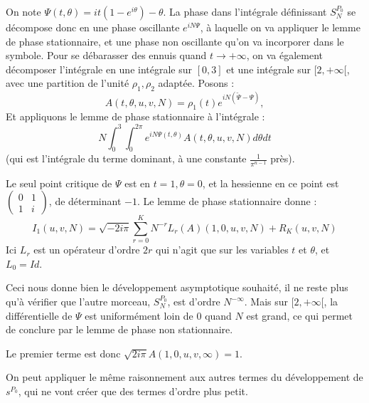 \begin{preuve}
	On note $\Psi(t,\theta) = it(1-e^{i\theta})-\theta$. La phase dans l'intégrale définissant $S_N^{P_0}$ se décompose donc en une phase oscillante $e^{iN\Psi}$, à laquelle on va appliquer le lemme de phase stationnaire, et une phase non oscillante qu'on va incorporer dans le symbole. Pour se débarasser des ennuis quand $t \to +\infty$, on va également décomposer l'intégrale en une intégrale sur $[0,3]$ et une intégrale sur $[2,+\infty[$, avec une partition de l'unité $\rho_1,\rho_2$ adaptée. Posons :
	\begin{equation*}
		A(t,\theta, u,v,N) = \rho_1(t)e^{iN(\tilde{\Psi}-\Psi)},
	\end{equation*} 
	Et appliquons le lemme de phase stationnaire à l'intégrale :
	\begin{equation*}
		N\int_0^3\int_0^{2\pi}e^{iN\Psi(t,\theta)}A(t,\theta, u,v,N)d\theta  dt
	\end{equation*}
	(qui est l'intégrale du terme dominant, à une constante $\frac{1}{\pi^{n-1}}$ près).
	
	Le seul point critique de $\Psi$ est en $t=1, \theta=0$, et la hessienne en ce point est $\begin{pmatrix}
	0&1\\1&i
	\end{pmatrix}$, de déterminant $-1$. Le lemme de phase stationnaire donne :
	\begin{equation*}
	I_1(u,v,N) =\sqrt{-2i\pi}\sum_{r=0}^K N^{-r}L_r(A)(1,0,u,v,N) + R_K(u,v,N)
	\end{equation*}
	Ici $L_r$ est un opérateur d'ordre $2r$ qui n'agit que sur les variables $t$ et $\theta$, et $L_0=Id$. 
	
	Ceci nous donne bien le développement asymptotique souhaité, il ne reste plus qu'à vérifier que l'autre morceau, $S_N^{P_0}$, est d'ordre $N^{-\infty}$. Mais sur $[2,+\infty[$, la différentielle de $\Psi$ est uniformément loin de $0$ quand $N$ est grand, ce qui permet de conclure par le lemme de phase non stationnaire.
	
	Le premier terme est donc $\sqrt{2i\pi}A(1,0,u,v,\infty) = 1$.
	
	On peut appliquer le même raisonnement aux autres termes du développement de $s^{P_0}$, qui ne vont créer que des termes d'ordre plus petit.
	\end{preuve}
	
